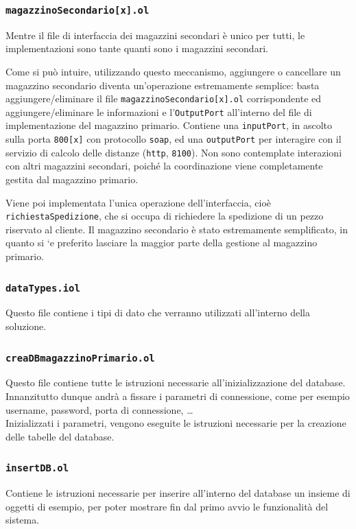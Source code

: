 
\subsubsection*{\tt magazzinoSecondario[x].ol}
Mentre il file di interfaccia dei magazzini secondari \`e unico per
tutti, le implementazioni sono tante quanti sono i magazzini secondari.

Come si pu\`o intuire, utilizzando questo meccanismo, aggiungere o
cancellare un magazzino secondario diventa un'operazione estremamente
semplice: basta aggiungere/eliminare il file
{\tt magazzinoSecondario[x].ol} corrispondente ed aggiungere/eliminare
le informazioni e l'{\tt OutputPort} all'interno del file di
implementazione del magazzino primario.
Contiene una {\tt inputPort}, in ascolto sulla porta {\tt 800[x]} con
protocollo {\tt soap}, ed una {\tt outputPort} per interagire con il
servizio di calcolo delle distanze ({\tt http}, {\tt 8100}).
Non sono contemplate interazioni con altri magazzini secondari, poich\'e
la coordinazione viene completamente gestita dal magazzino primario.

Viene poi implementata l'unica operazione dell'interfaccia, cio\`e
{\tt richiestaSpedizione}, che si occupa di richiedere la spedizione di
un pezzo riservato al cliente. Il magazzino secondario \`e stato
estremamente semplificato, in quanto si `e preferito lasciare la maggior
parte della gestione al magazzino primario.

\subsubsection*{\tt dataTypes.iol}
Questo file contiene i tipi di dato che verranno utilizzati all'interno
della soluzione.

\subsubsection*{\tt creaDBmagazzinoPrimario.ol}
Questo file contiene tutte le istruzioni necessarie all'inizializzazione
del database. Innanzitutto dunque andrà a fissare i parametri di
connessione, come per esempio username, password, porta di connessione,
\dots \\
Inizializzati i parametri, vengono eseguite le istruzioni necessarie per
la creazione delle tabelle del database.

\subsubsection*{\tt insertDB.ol}
Contiene le istruzioni necessarie per inserire all'interno del database
un insieme di oggetti di esempio, per poter mostrare fin dal primo avvio
le funzionalit\`a del sistema.

